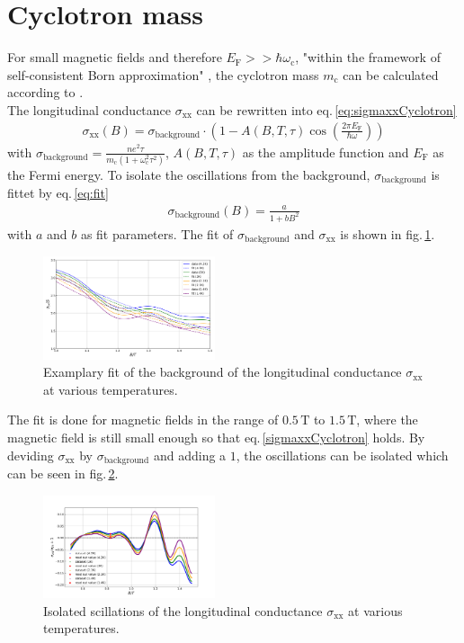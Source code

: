 \section{Cyclotron mass}
For small magnetic fields and therefore $E_\text{F}>>\hbar\omega_\text{c}$, "within the framework of self-consistent Born approximation" \cite{Tasksheet}, 
the cyclotron mass $m_\text{c}$ can be calculated according to \cite{Ando}.\\
The longitudinal conductance $\sigma_\text{xx}$ \cite{Ando} can be rewritten into eq.\,\ref{eq:sigmaxxCyclotron}
\begin{align}
    \sigma_\text{xx}(B) = \sigma_\text{background}\cdot\left(1-A(B,T,\tau)\cos{\left(\frac{2\pi E_\text{F}}{\hbar\omega}\right)}\right)
    \label{sigmaxxCyclotron}
\end{align}
with $\sigma_\text{background}=\frac{ne^2\tau}{m_\text{c}(1+\omega_\text{c}^2\tau^2)}$, $A(B,T,\tau)$ as the amplitude function and $E_\text{F}$ as the Fermi energy. 
To isolate the oscillations from the background, $\sigma_\text{background}$ is fittet by eq.\,\ref{eq:fit}
\begin{align}
    \sigma_\text{background}(B) = \frac{a}{1+bB^2}
    \label{eq:fit}
\end{align}
with $a$ and $b$ as fit parameters. The fit of $\sigma_\text{background}$ and $\sigma_\text{xx}$ is shown in fig.\,\ref{fig:fitCyclotron}.
\begin{figure}[h]
    \centering
    \includegraphics[width=0.45\textwidth]{../Images/sigmaWithFit.png}
    \caption{Examplary fit of the background of the longitudinal conductance $\sigma_\text{xx}$ at various temperatures.}
    \label{fig:fitCyclotron}
\end{figure}
The fit is done for magnetic fields in the range of $0.5\,\text{T}$ to $1.5\,\text{T}$, 
where the magnetic field is still small enough so that eq.\,\ref{sigmaxxCyclotron} holds.
By deviding $\sigma_\text{xx}$ by $\sigma_\text{background}$ and adding a $1$, the oscillations can be isolated which can
be seen in fig.\,\ref{fig:oscillationsCyclotron}.
\begin{figure}[h]
    \centering
    \includegraphics[width=0.45\textwidth]{../Images/reducedSigma.png}
    \caption{Isolated scillations of the longitudinal conductance $\sigma_\text{xx}$ at various temperatures.}
    \label{fig:oscillationsCyclotron}
\end{figure}
